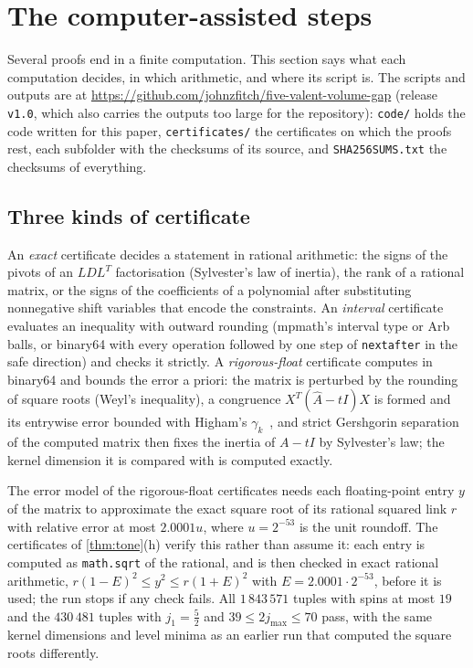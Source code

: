 \section{The computer-assisted steps}\label{sec:computer}

Several proofs end in a finite computation. This section says what each computation
decides, in which arithmetic, and where its script is. The scripts and outputs are at
\url{https://github.com/johnzfitch/five-valent-volume-gap} (release \texttt{v1.0}, which
also carries the outputs too large for the repository): \texttt{code/} holds the code
written for this paper, \texttt{certificates/} the certificates on which the proofs rest,
each subfolder with the checksums of its source, and \texttt{SHA256SUMS.txt} the
checksums of everything.

\subsection{Three kinds of certificate}

An \emph{exact} certificate decides a statement in rational arithmetic: the signs of the
pivots of an $LDL^T$ factorisation (Sylvester's law of inertia), the rank of a rational
matrix, or the signs of the coefficients of a polynomial after substituting nonnegative
shift variables that encode the constraints. An \emph{interval} certificate evaluates
an inequality with outward rounding (mpmath's interval type or Arb balls, or binary64
with every operation followed by one step of \texttt{nextafter} in the safe direction)
and checks it strictly. A \emph{rigorous-float} certificate computes in binary64 and
bounds the error a priori: the matrix is perturbed by the rounding of square roots
(Weyl's inequality), a congruence $X^T(\widehat A-tI)X$ is formed and its entrywise error
bounded with Higham's $\gamma_k$~\cite[Lemma~3.5]{Higham}, and strict Gershgorin
separation of the computed matrix then fixes the inertia of $A-tI$ by Sylvester's law;
the kernel dimension it is compared with is computed exactly.

The error model of the rigorous-float certificates needs each floating-point entry
$y$ of the matrix to approximate the exact square root of its rational squared link $r$
with relative error at most $2.0001u$, where $u=2^{-53}$ is the unit roundoff. The certificates of \cref{thm:tone}(h) verify
this rather than assume it: each entry is computed as \texttt{math.sqrt} of the
rational, and is then checked in exact rational arithmetic,
$r(1-E)^2\le y^2\le r(1+E)^2$ with $E=2.0001\cdot2^{-53}$, before it is used; the run
stops if any check fails. All $1\,843\,571$ tuples with spins at most $19$ and the
$430\,481$ tuples with $j_1=\frac52$ and $39\le2j_{\max}\le70$ pass, with the same
kernel dimensions and level minima as an earlier run that computed the square roots
differently.


